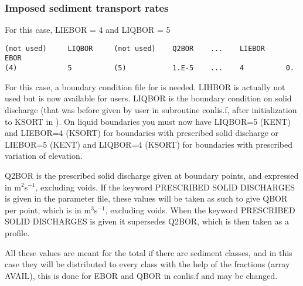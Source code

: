 \subsubsection{Imposed sediment transport rates}
For this case, {\ttfamily LIEBOR = 4} and  {\ttfamily LIQBOR = 5}
 \begin{verbatim}
(not used)     LIQBOR     (not used)    Q2BOR    ...    LIEBOR     EBOR
(4)            5          (5)           1.E-5    ...    4          0.         
\end{verbatim}
For this case, a boundary condition file for \sisyphe is needed. {\ttfamily LIHBOR} is actually not used but is now available for users. {\ttfamily LIQBOR} is the boundary condition on solid discharge (that was before given by user in subroutine {\ttfamily conlis.f}, after initialization to {\ttfamily KSORT} in \sisyphe). On liquid boundaries you must now have {\ttfamily LIQBOR=5 (KENT)} and {\ttfamily LIEBOR=4 (KSORT)} for boundaries with prescribed solid discharge or {\ttfamily LIEBOR=5 (KENT)} and {\ttfamily LIQBOR=4 (KSORT)} for boundaries with prescribed variation of elevation. 

{\ttfamily Q2BOR} is the prescribed solid discharge given at boundary points, and expressed in m$^2$s$^{-1}$, excluding voids. If the keyword {\ttfamily PRESCRIBED SOLID DISCHARGES} is given in the parameter file, these values will be taken as such to give {\ttfamily QBOR} per point, which is in m$^3$s$^{-1}$, excluding voids. When the keyword {\ttfamily PRESCRIBED SOLID DISCHARGES} is given it supersedes {\ttfamily Q2BOR}, which is then taken as a profile.

All these values are meant for the total if there are sediment classes, and in this case they will be distributed to every class with the help of the fractions (array {\ttfamily AVAIL}), this is done for {\ttfamily EBOR} and {\ttfamily QBOR} in {\ttfamily conlis.f} and may be changed.




